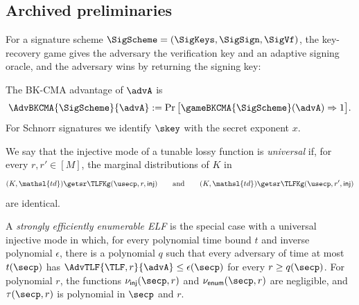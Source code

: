 
\subsection*{Archived preliminaries}

For a signature scheme $\SigScheme=(\SigKeys,\SigSign,\SigVf)$, the key-recovery game gives the adversary the verification key and an adaptive signing oracle, and the adversary wins by returning the signing key:
\begin{center}
\end{center}
The BK-CMA advantage of $\advA$ is
$$
\AdvBKCMA{\SigScheme}{\advA}
:=
\Pr\big[\gameBKCMA{\SigScheme}(\advA)\Rightarrow1\big].
$$
For Schnorr signatures we identify $\skey$ with the secret exponent $x$.

We say that the injective mode of a tunable lossy function is \emph{universal} if, for every $r,r'\in[M]$, the marginal distributions of $K$ in
$$
(K,\mathsl{td})\getsr\TLFKg(\usecp,r,\mathsf{inj})
\qquad\text{and}\qquad
(K,\mathsl{td})\getsr\TLFKg(\usecp,r',\mathsf{inj})
$$
are identical.

A \emph{strongly efficiently enumerable ELF} is the special case with a universal injective mode in which, for every polynomial time bound $t$ and inverse polynomial $\epsilon$, there is a polynomial $q$ such that every adversary of time at most $t(\secp)$ has $\AdvTLF{\TLF,r}{\advA}\le\epsilon(\secp)$ for every $r\ge q(\secp)$. For polynomial $r$, the functions $\nu_{\mathsf{inj}}(\secp,r)$ and $\nu_{\mathsf{enum}}(\secp,r)$ are negligible, and $\tau(\secp,r)$ is polynomial in $\secp$ and $r$.


